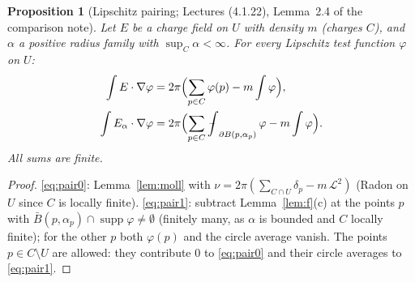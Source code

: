 \documentclass[11pt]{article}
\newtheorem{proposition}[theorem]{Proposition}
\theoremstyle{definition}
\theoremstyle{remark}
\newcommand{\avg}{\fint}
\DeclareMathOperator{\supp}{supp}
\def\fint{\mathop{\,\rlap{--}\!\!\int}\nolimits}
\begin{document}
\begin{proposition}[Lipschitz pairing; Lectures (4.1.22), Lemma~2.4 of the comparison note]\label{prop:pairing}
Let $E$ be a charge field on $U$ with density $m$ (charges $C$), and $\alpha$ a positive radius family with
$\sup_C\alpha<\infty$. For every Lipschitz test function $\varphi$ on $U$:
\begin{align}
\int E\cdot\nabla\varphi&=2\pi\Bigl(\sum_{p\in C}\varphi(p)-m\int\varphi\Bigr),\label{eq:pair0}\\
\int E_\alpha\cdot\nabla\varphi&=2\pi\Bigl(\sum_{p\in C}\avg_{\partial B(p,\alpha_p)}\varphi-m\int\varphi\Bigr).\label{eq:pair1}
\end{align}
All sums are finite.
\end{proposition}
\begin{proof}
\eqref{eq:pair0}: Lemma~\ref{lem:moll} with $\nu=2\pi(\sum_{C\cap U}\delta_p-m\,\mathcal L^2)$ (Radon on $U$ since $C$ is locally finite).
\eqref{eq:pair1}: subtract Lemma~\ref{lem:f}(c) at the points $p$ with $\bar B(p,\alpha_p)\cap\supp\varphi\ne\emptyset$ (finitely many,
as $\alpha$ is bounded and $C$ locally finite); for the other $p$ both $\varphi(p)$ and the circle average vanish.
The points $p\in C\setminus U$ are allowed: they contribute $0$ to \eqref{eq:pair0} and their circle averages to \eqref{eq:pair1}.
\end{proof}
\end{document}
